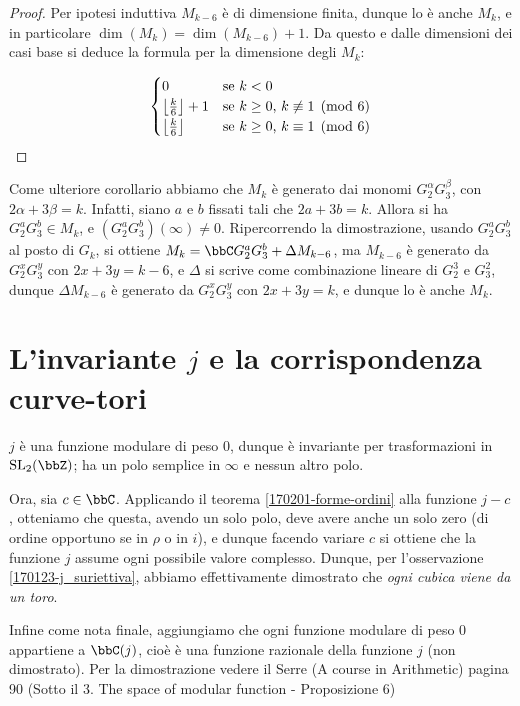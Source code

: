 \begin{proof}
	Per ipotesi induttiva $M_{k-6}$ è di dimensione finita, dunque lo è anche $M_k$, e in particolare $\dim(M_k)=\dim(M_{k-6})+1$.
	Da questo e dalle dimensioni dei casi base si deduce la formula per la dimensione degli $M_k$:

	\begin{equation*}
		\begin{cases}
			0 						&	\text{se $k<0$}\\
			\left\lfloor \frac{k}{6} \right\rfloor +1	&	\text{se $k\geq0$, $k\not\equiv1\pmod{6}$}\\
			\left\lfloor \frac{k}{6} \right\rfloor		&	\text{se $k\geq0$, $k\equiv1\pmod{6}$}
		\end{cases}
	\end{equation*}

\end{proof}

Come ulteriore corollario abbiamo che $M_k$ è generato dai monomi $G_2^\alpha G_3^\beta$, con $2\alpha+3\beta=k$.
Infatti, siano $a$ e $b$ fissati tali che $2a+3b=k$.
Allora si ha $G_2^a G_3^b\in M_k$, e $(G_2^a G_3^b)(\infty)\neq0$.
Ripercorrendo la dimostrazione, usando $G_2^a G_3^b$ al posto di $G_k$, si ottiene $M_k=\bbC G_2^a G_3^b + \Delta M_{k-6}$, ma $M_{k-6}$ è generato da $G_2^x G_3^y$ con $2x+3y=k-6$, e $\Delta$ si scrive come combinazione lineare di $G_2^3$ e $G_3^2$, dunque $\Delta M_{k-6}$ è generato da $G_2^x G_3^y$ con $2x+3y=k$, e dunque lo è anche $M_k$.


\section{L'invariante $j$ e la corrispondenza curve-tori}

$j$ è una funzione modulare di peso $0$, dunque è invariante per trasformazioni in $\SL_2(\bbZ)$; ha un polo semplice in $\infty$ e nessun altro polo.

Ora, sia $c \in \bbC$. Applicando il teorema \ref{170201-forme-ordini} alla funzione $j-c$, otteniamo che questa, avendo un solo polo, deve avere anche un solo zero (di ordine opportuno se in $\rho$ o in $i$), e dunque facendo variare $c$ si ottiene che la funzione $j$ assume ogni possibile valore complesso. Dunque, per l'osservazione \ref{170123-j_suriettiva}, abbiamo effettivamente dimostrato che \emph{ogni cubica viene da un toro}.

Infine come nota finale, aggiungiamo che ogni funzione modulare di peso $0$ appartiene a $\bbC(j)$, cioè è una funzione razionale della funzione $j$ (non dimostrato). Per la dimostrazione vedere il Serre (A course in Arithmetic) pagina 90 (Sotto il 3. The space of modular function - Proposizione 6)

